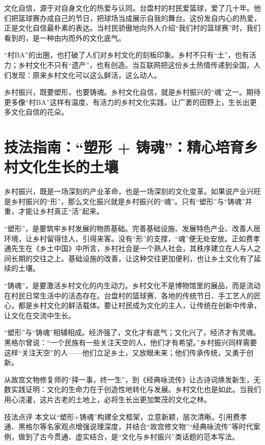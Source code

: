 文化自信，源于对自身文化的热爱与认同。台盘村的村民爱篮球，爱了几十年。他们把篮球赛办成自己的节日，把球场当成展示自我的舞台。这份发自内心的热爱，正是文化自信最朴素的表达。当村民骄傲地向外人介绍“我们村的篮球赛”时，我们看到的，是一种由内而外的文化底气。

“村BA”的出圈，也打破了人们对乡村文化的刻板印象。乡村不只有“土”，也有活力；乡村文化不只有“遗产”，也有创造。当互联网把这份乡土热情传递到全国，人们发现：原来乡村文化可以这么鲜活，这么动人。

乡村振兴，既要塑形，也要铸魂。乡村文化自信，就是乡村振兴的“魂”之一。期待更多像“村BA”这样有温度、有活力的乡村文化实践，让广袤的田野上，生长出更多文化自信的花朵。

\clearpage
\section*{技法指南：“塑形 + 铸魂”：精心培育乡村文化生长的土壤}

乡村振兴，既是一场深刻的产业革命，也是一场深刻的文化变革。如果说产业兴旺是乡村振兴的“形”，那么文化振兴就是乡村振兴的“魂”。只有“塑形”与“铸魂”并重，才能让乡村真正“活”起来。

“塑形”，是要筑牢乡村发展的物质基础。完善基础设施、发展特色产业、改善人居环境，让乡村留得住人、引得来客。没有“形”的支撑，“魂”便无处安放。正如费孝通先生在《乡土中国》中所言，乡村社会是一个熟人社会，其秩序建立在人与人之间长期的交往之上。基础设施的改善，让这种交往更加便利，也让乡土文化有了延续的土壤。

“铸魂”，是要激活乡村文化的内生动力。乡村文化不是博物馆里的展品，而是流动在村民日常生活中的活态存在。台盘村的篮球赛、各地的传统节日、手工艺人的匠心，都是乡村文化的鲜活载体。要让村民成为文化的主人，让传统在创新中传承，让文化在交流中生长。

“塑形”与“铸魂”相辅相成。经济强了，文化才有底气；文化兴了，经济才有灵魂。黑格尔曾说：“一个民族有一些关注天空的人，他们才有希望。”乡村振兴同样需要这样“关注天空”的人——他们立足乡土，又放眼未来；他们传承传统，又勇于创新。

从故宫文物修复师的“择一事，终一生”，到《经典咏流传》让古诗词焕发新生，无数实践证明：文化的生命力在于创造性地转化与发展。乡村文化也是如此。当我们用心浇灌，这片古老的土地上，必将生长出更加繁茂的文化之林。

\begin{quoteBox}{技法点评}
本文以“塑形+铸魂”构建全文框架，立意新颖，层次清晰。引用费孝通、黑格尔等名家观点增强说理深度，并结合“故宫修文物”“经典咏流传”等时代案例，做到了古今贯通、虚实结合，是“文化与乡村振兴”类话题的范本写法。
\end{quoteBox}

